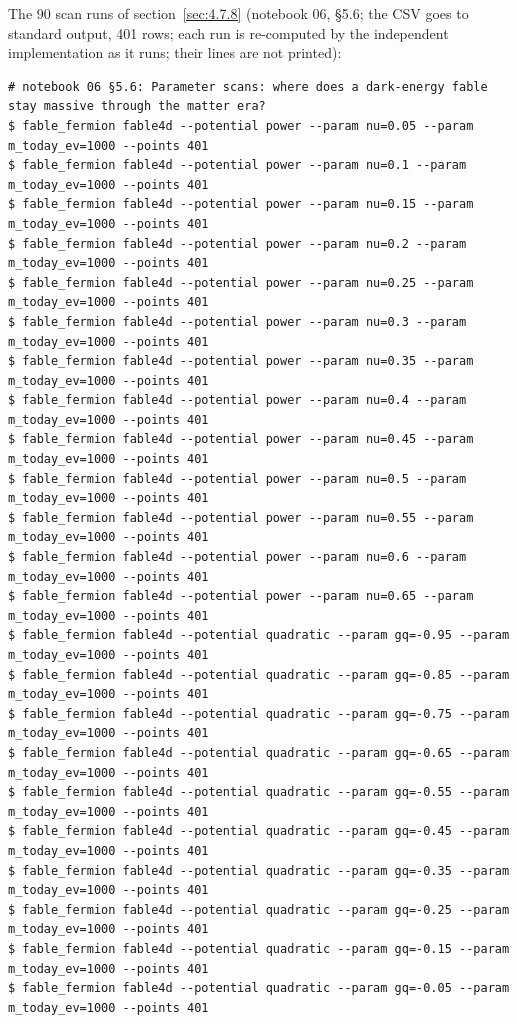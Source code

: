 The 90 scan runs of section~\ref{sec:4.7.8} (notebook 06, \S{}5.6; the CSV goes to standard output, 401 rows; each run is re-computed by the independent implementation as it runs; their  lines are not printed):

\begin{Verbatim}
# notebook 06 §5.6: Parameter scans: where does a dark-energy fable stay massive through the matter era?
$ fable_fermion fable4d --potential power --param nu=0.05 --param m_today_ev=1000 --points 401
$ fable_fermion fable4d --potential power --param nu=0.1 --param m_today_ev=1000 --points 401
$ fable_fermion fable4d --potential power --param nu=0.15 --param m_today_ev=1000 --points 401
$ fable_fermion fable4d --potential power --param nu=0.2 --param m_today_ev=1000 --points 401
$ fable_fermion fable4d --potential power --param nu=0.25 --param m_today_ev=1000 --points 401
$ fable_fermion fable4d --potential power --param nu=0.3 --param m_today_ev=1000 --points 401
$ fable_fermion fable4d --potential power --param nu=0.35 --param m_today_ev=1000 --points 401
$ fable_fermion fable4d --potential power --param nu=0.4 --param m_today_ev=1000 --points 401
$ fable_fermion fable4d --potential power --param nu=0.45 --param m_today_ev=1000 --points 401
$ fable_fermion fable4d --potential power --param nu=0.5 --param m_today_ev=1000 --points 401
$ fable_fermion fable4d --potential power --param nu=0.55 --param m_today_ev=1000 --points 401
$ fable_fermion fable4d --potential power --param nu=0.6 --param m_today_ev=1000 --points 401
$ fable_fermion fable4d --potential power --param nu=0.65 --param m_today_ev=1000 --points 401
$ fable_fermion fable4d --potential quadratic --param gq=-0.95 --param m_today_ev=1000 --points 401
$ fable_fermion fable4d --potential quadratic --param gq=-0.85 --param m_today_ev=1000 --points 401
$ fable_fermion fable4d --potential quadratic --param gq=-0.75 --param m_today_ev=1000 --points 401
$ fable_fermion fable4d --potential quadratic --param gq=-0.65 --param m_today_ev=1000 --points 401
$ fable_fermion fable4d --potential quadratic --param gq=-0.55 --param m_today_ev=1000 --points 401
$ fable_fermion fable4d --potential quadratic --param gq=-0.45 --param m_today_ev=1000 --points 401
$ fable_fermion fable4d --potential quadratic --param gq=-0.35 --param m_today_ev=1000 --points 401
$ fable_fermion fable4d --potential quadratic --param gq=-0.25 --param m_today_ev=1000 --points 401
$ fable_fermion fable4d --potential quadratic --param gq=-0.15 --param m_today_ev=1000 --points 401
$ fable_fermion fable4d --potential quadratic --param gq=-0.05 --param m_today_ev=1000 --points 401

\end{Verbatim}
